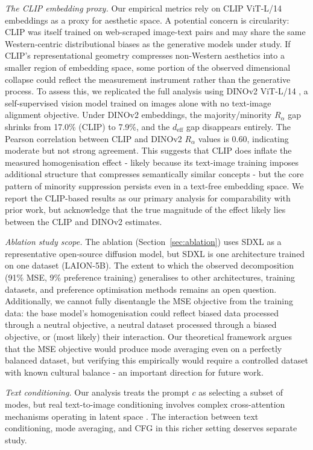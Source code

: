 \documentclass[11pt]{article}
\begin{document}
\textit{The CLIP embedding proxy.} Our empirical metrics rely on CLIP ViT-L/14 embeddings as a proxy for aesthetic space. A potential concern is circularity: CLIP was itself trained on web-scraped image-text pairs \citep{Radford2021} and may share the same Western-centric distributional biases as the generative models under study. If CLIP's representational geometry compresses non-Western aesthetics into a smaller region of embedding space, some portion of the observed dimensional collapse could reflect the measurement instrument rather than the generative process. To assess this, we replicated the full analysis using DINOv2 ViT-L/14 \citep{Oquab2024}, a self-supervised vision model trained on images alone with no text-image alignment objective. Under DINOv2 embeddings, the majority/minority $R_\alpha$ gap shrinks from 17.0\% (CLIP) to 7.9\%, and the $d_{\mathrm{eff}}$ gap disappears entirely. The Pearson correlation between CLIP and DINOv2 $R_\alpha$ values is 0.60, indicating moderate but not strong agreement. This suggests that CLIP does inflate the measured homogenisation effect - likely because its text-image training imposes additional structure that compresses semantically similar concepts - but the core pattern of minority suppression persists even in a text-free embedding space. We report the CLIP-based results as our primary analysis for comparability with prior work, but acknowledge that the true magnitude of the effect likely lies between the CLIP and DINOv2 estimates.

\textit{Ablation study scope.} The ablation (Section~\ref{sec:ablation}) uses SDXL as a representative open-source diffusion model, but SDXL is one architecture trained on one dataset (LAION-5B). The extent to which the observed decomposition (91\% MSE, 9\% preference training) generalises to other architectures, training datasets, and preference optimisation methods remains an open question. Additionally, we cannot fully disentangle the MSE objective from the training data: the base model's homogenisation could reflect biased data processed through a neutral objective, a neutral dataset processed through a biased objective, or (most likely) their interaction. Our theoretical framework argues that the MSE objective would produce mode averaging even on a perfectly balanced dataset, but verifying this empirically would require a controlled dataset with known cultural balance - an important direction for future work.

\textit{Text conditioning.} Our analysis treats the prompt $c$ as selecting a subset of modes, but real text-to-image conditioning involves complex cross-attention mechanisms operating in latent space \citep{Rombach2022}. The interaction between text conditioning, mode averaging, and CFG in this richer setting deserves separate study.
\end{document}
